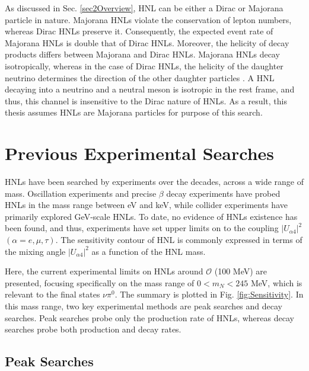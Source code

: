 As discussed in Sec. \ref{sec2Overview}, HNL can be either a Dirac or Majorana particle in nature.
Majorana HNLs violate the conservation of lepton numbers, whereas Dirac HNLs preserve it.
Consequently, the expected event rate of Majorana HNLs is double that of Dirac HNLs.
Moreover, the helicity of decay products differs between Majorana and Dirac HNLs.
Majorana HNLs decay isotropically, whereas in the case of Dirac HNLs, the helicity of the daughter neutrino determines the direction of the other daughter particles \cite{HNLSilvia}.
A HNL decaying into a neutrino and a neutral meson is isotropic in the rest frame, and thus, this channel is insensitive to the Dirac nature of HNLs.
As a result, this thesis assumes HNLs are Majorana particles for purpose of this search.

\section{Previous Experimental Searches}
\label{sec2Previous}


HNLs have been searched by experiments over the decades, across a wide range of mass.
Oscillation experiments and precise $\beta$ decay experiments have probed HNLs in the mass range between eV and keV, while collider experiments have primarily explored GeV-scale HNLs.
To date, no evidence of HNLs existence has been found, and thus, experiments have set upper limits on to the coupling $|U_{\alpha4}|^{2}$ $(\alpha=e,\mu,\tau)$.
The sensitivity contour of HNL is commonly expressed in terms of the mixing angle $|U_{\alpha4}|^{2}$ as a function of the HNL mass.

Here, the current experimental limits on HNLs around $\mathcal{O}$ (100 MeV) are presented, focusing specifically on the mass range of $ 0 < m_{N} < 245 $ MeV, which is relevant to the final states $\nu\pi^{0}$.
The summary is plotted in Fig. \ref{fig:Sensitivity}.
In this mass range, two key experimental methods are peak searches and decay searches.
Peak searches probe only the production rate of HNLs, whereas decay searches probe both production and decay rates.


\subsection{Peak Searches}


